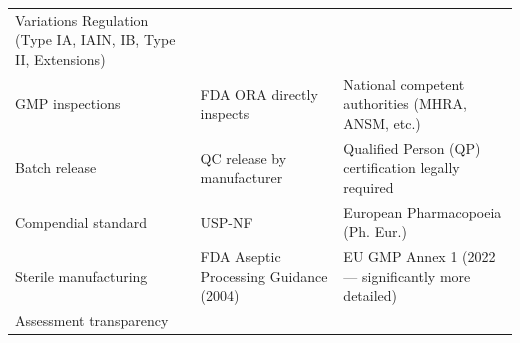\documentclass[
  11pt,
  a4paper,
]{report}
\begin{document}
\begin{longtable}[]{@{}lll@{}}
\begin{minipage}[t]{0.33\columnwidth}
Variations Regulation (Type IA, IAIN, IB, Type II, Extensions)\strut
\end{minipage}\tabularnewline
\begin{minipage}[t]{0.26\columnwidth}\raggedright
GMP inspections\strut
\end{minipage} & \begin{minipage}[t]{0.33\columnwidth}\raggedright
FDA ORA directly inspects\strut
\end{minipage} & \begin{minipage}[t]{0.33\columnwidth}\raggedright
National competent authorities (MHRA, ANSM, etc.)\strut
\end{minipage}\tabularnewline
\begin{minipage}[t]{0.26\columnwidth}\raggedright
Batch release\strut
\end{minipage} & \begin{minipage}[t]{0.33\columnwidth}\raggedright
QC release by manufacturer\strut
\end{minipage} & \begin{minipage}[t]{0.33\columnwidth}\raggedright
Qualified Person (QP) certification legally required\strut
\end{minipage}\tabularnewline
\begin{minipage}[t]{0.26\columnwidth}\raggedright
Compendial standard\strut
\end{minipage} & \begin{minipage}[t]{0.33\columnwidth}\raggedright
USP-NF\strut
\end{minipage} & \begin{minipage}[t]{0.33\columnwidth}\raggedright
European Pharmacopoeia (Ph. Eur.)\strut
\end{minipage}\tabularnewline
\begin{minipage}[t]{0.26\columnwidth}\raggedright
Sterile manufacturing\strut
\end{minipage} & \begin{minipage}[t]{0.33\columnwidth}\raggedright
FDA Aseptic Processing Guidance (2004)\strut
\end{minipage} & \begin{minipage}[t]{0.33\columnwidth}\raggedright
EU GMP Annex 1 (2022 --- significantly more detailed)\strut
\end{minipage}\tabularnewline
\begin{minipage}[t]{0.26\columnwidth}\raggedright
Assessment transparency\strut
\end{minipage} & \begin{minipage}[t]{0.33\columnwidth}\raggedright

\end{minipage}
\end{longtable}
\end{document}
